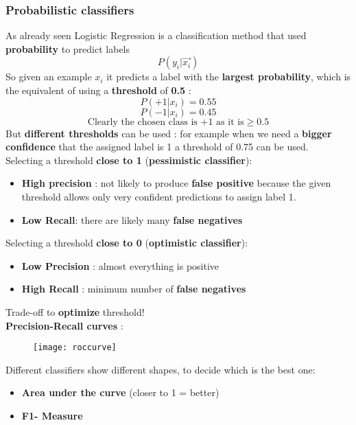 \subsubsection{Probabilistic classifiers}
As already seen Logistic Regression is a classification method that used \textbf{probability} to predict labels $$ P(y_i|\overrightarrow{x_i})$$
So given an example $x_i$ it predicts a label with the \textbf{largest probability}, which is the equivalent of using a \textbf{threshold} of \textbf{0.5} :
$$ P(+1|x_i) = 0.55$$
$$ P(-1|x_i) = 0.45$$
$$ \text{Clearly the chosen class is +1 as it is} \geq 0.5$$
But \textbf{different thresholds} can be used : for example when we need a \textbf{bigger confidence} that the assigned label is 1 a threshold of 0.75 can be used.\\
Selecting a threshold \textbf{close to 1} (\textbf{pessimistic classifier}):
\begin{itemize}
\item \textbf{High precision }: not likely to produce \textbf{false positive} because the given threshold allows only very confident predictions to assign label 1.
\item \textbf{Low Recall}: there are likely many \textbf{false negatives}
\end{itemize}
Selecting a threshold \textbf{close to 0} (\textbf{optimistic classifier}):
\begin{itemize}
\item \textbf{Low Precision} : almost everything is positive
\item \textbf{High Recall} : minimum number of \textbf{false negatives}
\end{itemize}
Trade-off to \textbf{optimize} threshold!\\
\textbf{Precision-Recall curves} : 
\begin{figure}[H]
  \centering
  \texttt{[image: roccurve]}
\end{figure}
Different classifiers show different shapes, to decide which is the best one:
\begin{itemize}
\item \textbf{Area under the curve} (closer to 1 = better)
\item \textbf{F1- Measure}
\end{itemize}

